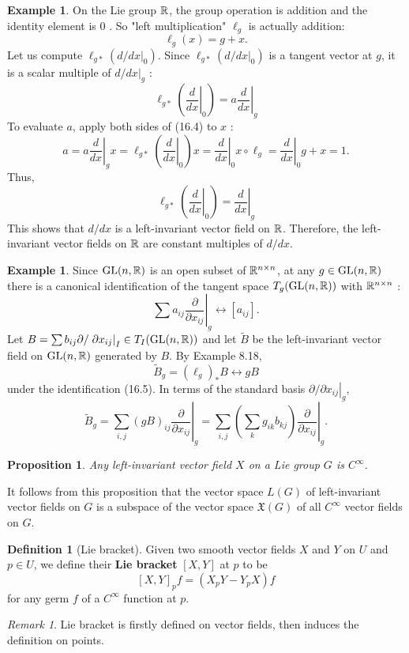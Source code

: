 \documentclass{amsart}
\let\originalmathbb\mathbb
\renewcommand{\mathbb}[1]{%
    \ifstrequal{#1}{1}{\mathbbm{#1}}{\originalmathbb{#1}}%
}
\theoremstyle{plain}
\newtheorem{proposition}[theorem]{Proposition}
\theoremstyle{definition}
\newtheorem{definition}[theorem]{Definition}
\newtheorem{example}[theorem]{Example}
\theoremstyle{remark}
\newtheorem{remark}[theorem]{Remark}
\begin{document}
\begin{example}
On the Lie group $\mathbb{R}$, the group operation is addition and the identity element is 0 . So "left multiplication" $\ell_g$ is actually addition:
\[
\ell_g(x)=g+x .
\]Let us compute $\ell_{g *}\left(d /\left.d x\right|_0\right)$. Since $\ell_{g *}\left(d /\left.d x\right|_0\right)$ is a tangent vector at $g$, it is a scalar multiple of $d /\left.d x\right|_g$ :
\[
\ell_{g *}\left(\left.\frac{d}{d x}\right|_0\right)=\left.a \frac{d}{d x}\right|_g
\]To evaluate $a$, apply both sides of (16.4) to $x$ :
\[
a=\left.a \frac{d}{d x}\right|_g x=\ell_{g *}\left(\left.\frac{d}{d x}\right|_0\right) x=\left.\frac{d}{d x}\right|_0 x \circ \ell_g=\left.\frac{d}{d x}\right|_0 g+x=1 .
\]Thus,
\[
\ell_{g *}\left(\left.\frac{d}{d x}\right|_0\right)=\left.\frac{d}{d x}\right|_g
\]This shows that $d / d x$ is a left-invariant vector field on $\mathbb{R}$. Therefore, the left-invariant vector fields on $\mathbb{R}$ are constant multiples of $d / d x$.
\end{example}
\begin{example}
Since $\mathrm{GL}(n, \mathbb{R})$ is an open subset of $\mathbb{R}^{n \times n}$, at any $g \in \mathrm{GL}(n, \mathbb{R})$ there is a canonical identification of the tangent space $T_g(\operatorname{GL}(n, \mathbb{R}))$ with $\mathbb{R}^{n \times n}$ :
\[
\left.\sum a_{i j} \frac{\partial}{\partial x_{i j}}\right|_g \leftrightarrow\left[a_{i j}\right] .
\]Let $B=\sum b_{i j} \partial /\left.\partial x_{i j}\right|_I \in T_I(\mathrm{GL}(n, \mathbb{R}))$ and let $\tilde{B}$ be the left-invariant vector field on $\operatorname{GL}(n, \mathbb{R})$ generated by $B$. By Example 8.18,
\[
\tilde{B}_g=\left(\ell_g\right)_* B \leftrightarrow g B
\]under the identification (16.5). In terms of the standard basis $\partial /\left.\partial x_{i j}\right|_g$,
\[
\tilde{B}_g=\left.\sum_{i, j}(g B)_{i j} \frac{\partial}{\partial x_{i j}}\right|_g=\left.\sum_{i, j}\left(\sum_k g_{i k} b_{k j}\right) \frac{\partial}{\partial x_{i j}}\right|_g .
\]
\end{example}
\begin{proposition}
Any left-invariant vector field $X$ on a Lie group $G$ is $C^{\infty}$.
\end{proposition}
It follows from this proposition that the vector space $L(G)$ of left-invariant vector fields on $G$ is a subspace of the vector space $\mathfrak{X}(G)$ of all $C^{\infty}$ vector fields on $G$.

\begin{definition}[Lie bracket]
Given two smooth vector fields $X$ and $Y$ on $U$ and $p \in U$, we define their \textbf{Lie bracket} $[X, Y]$ at $p$ to be
\[
[X, Y]_p f=\left(X_p Y-Y_p X\right) f
\]for any germ $f$ of a $C^{\infty}$ function at $p$.
\end{definition}
\begin{remark}
Lie bracket is firstly defined on vector fields, then induces the definition on points.\label{cad013}
\end{remark}
\end{document}
